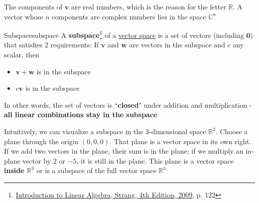 
The components of $\boldsymbol{v}$ are real numbers, which is the reason for the letter $\mathbb{R}$. A vector whose $n$
components are complex numbers lies in the space $\mathbb{C}^n$

\begin{Definition}{Subspace}{subspace}
    A \textbf{subspace}\footnote{\href{https://trello.com/c/qHJeDNkU}{Introduction to Linear Algebra, Strang, 4th Edition, 2009}, p. 122}
    of a \hyperlink{vector-space}{vector space} is a set of vectors (including $\boldsymbol{0}$) that satisfies 2
    requirements: If $\boldsymbol{v}$ and $\boldsymbol{w}$ are vectors in the subspace and $c$ any scalar, then

    \begin{itemize}
        \item $\boldsymbol{v} + \boldsymbol{w}$ is in the subspace
        \item $c\boldsymbol{v}$ is in the subspace
    \end{itemize}

    In other words, the set of vectors is ``\textbf{closed}" under addition and multiplication - \textbf{all linear combinations
    stay in the subspace}

\end{Definition}

Intuitively, we can visualize a subspace in the 3-dimensional space $\mathbb{R}^3$. Choose a plane through the
origin $(0, 0, 0)$. That plane is a vector space in its own right. If we add two vectors in the plane, their sum is in
the plane; if we multiply an in-plane vector by $2$ or $-5$, it is still in the plane. This plane is a vector space
\textbf{inside $\mathbb{R}^3$} or is a subspace of the full vector space $\mathbb{R}^3$


